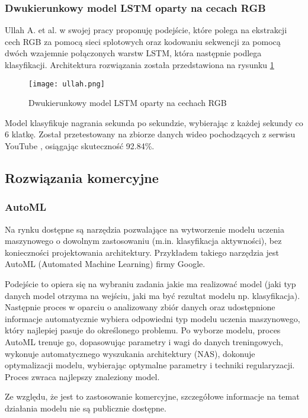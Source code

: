 \subsubsection{Dwukierunkowy model LSTM oparty na cecach RGB}
Ullah A. et al. \cite{Ullah2017} w swojej pracy proponuję podejście, które polega na ekstrakcji cech RGB za pomocą sieci splotowych oraz kodowaniu sekwencji za pomocą dwóch wzajemnie połączonych warstw LSTM, która następnie podlega klasyfikacji. Architektura rozwiązania została przedstawiona na rysunku \ref{fig:ullah-arch}
\begin{figure}[!h]
    \centering \texttt{[image: ullah.png]}
    \caption{Dwukierunkowy model LSTM oparty na cechach RGB}
    \label{fig:ullah-arch}
\end{figure}
Model klasyfikuje nagrania sekunda po sekundzie, wybierając z każdej sekundy co 6 klatkę. Został przetestowany na zbiorze danych wideo pochodzących z serwisu YouTube \cite{yt_dataset}, osiągając skuteczność 92.84\%. 

\subsection{Rozwiązania komercyjne}
\subsubsection{AutoML} 
Na rynku dostępne są narzędzia pozwalające na wytworzenie modelu uczenia maszynowego o dowolnym zastosowaniu (m.in. klasyfikacja aktywności), bez konieczności projektowania architektury. Przykładem takiego narzędzia jest AutoML (Automated Machine Learning)\cite{automl} firmy Google. 

Podejście to opiera się na wybraniu zadania jakie ma realizować model (jaki typ danych model otrzyma na wejściu, jaki ma być rezultat modelu np. klasyfikacja). Następnie proces w oparciu o analizowany zbiór danych oraz udostępnione informacje automatycznie wybiera odpowiedni typ modelu uczenia maszynowego, który najlepiej pasuje do określonego problemu. Po wyborze modelu, proces AutoML trenuje go, dopasowując parametry i wagi do danych treningowych, wykonuje automatycznego wyszukania architektury (NAS), dokonuje optymalizacji modelu, wybierając optymalne parametry i techniki regularyzacji. Proces zwraca najlepszy znaleziony model. 

Ze względu, że jest to zastosowanie komercyjne, szczegółowe informacje na temat działania modelu nie są publicznie dostępne.
